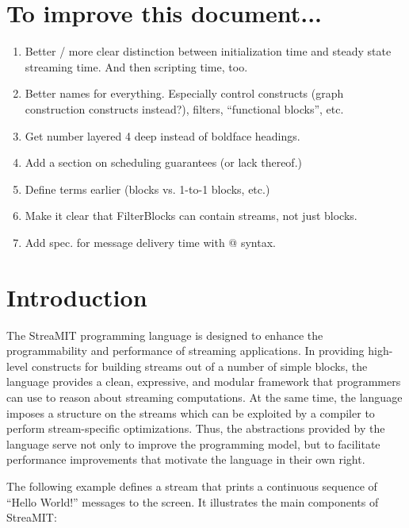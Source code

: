 \documentclass[draft]{article}
\begin{document}
\section{To improve this document...}

\begin{enumerate}

\item Better / more clear distinction between initialization time and
steady state streaming time.  And then scripting time, too.

\item Better names for everything.  Especially control constructs
(graph construction constructs instead?), filters, ``functional
blocks'', etc.

\item Get number layered 4 deep instead of boldface headings.

\item Add a section on scheduling guarantees (or lack thereof.)

\item Define terms earlier (blocks vs. 1-to-1 blocks, etc.)

\item Make it clear that FilterBlocks can contain streams, not just
blocks.

\item Add spec. for message delivery time with @ syntax.

\end{enumerate}

\section{Introduction}
\label{sec:intro}

The StreaMIT programming language is designed to enhance the
programmability and performance of streaming applications.  In
providing high-level constructs for building streams out of a number
of simple blocks, the language provides a clean, expressive, and
modular framework that programmers can use to reason about streaming
computations.  At the same time, the language imposes a structure on
the streams which can be exploited by a compiler to perform
stream-specific optimizations.  Thus, the abstractions provided by the
language serve not only to improve the programming model, but to
facilitate performance improvements that motivate the language in
their own right.

The following example defines a stream that prints a continuous
sequence of ``Hello World!'' messages to the screen.  It illustrates
the main components of StreaMIT:
\end{document}
